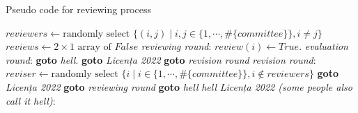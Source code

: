 \begin{algorithm}[ht]
    \caption{Pseudo code for reviewing process}\label{alg:acceptance}
    \begin{algorithmic}[1]
            \State $\textit{reviewers} \gets \text{randomly select } \{(i,j) \mid i,j \in  \{1, \cdots, \#\{\textit{committee}\}\}, i \neq j \}$
            \State $\textit{reviews} \gets 2 \times 1 \text{ array of } \textit{False}$
            \BState \emph{reviewing round}:
                    \State $\textit{review}(i) \gets \textit{True}$.
                \Else {}
                \EndIf
            \EndFor
            \BState \emph{evaluation round}:
                \State \textbf{goto} \emph{hell}.
                \State \textbf{goto} \emph{Licența 2022}
            \Else \textbf{ goto} \emph{revision round}
            \EndIf
            \BState \emph{revision round}:
            \State $\textit{reviser} \gets \text{randomly select } \{i \mid i \in  \{1, \cdots, \#\{\textit{committee}\}\}, i \not\in \textit{reviewers} \}$
                \State \textbf{ goto} \emph{Licența 2022}
                \State \textbf{ goto} \emph{reviewing round}
            \Else \textbf{ goto} \emph{hell}
            \EndIf
            \BState \emph{hell} 
            \State {}
            \BState \emph{Licența 2022 (some people also call it hell)}:
            \State {}
        \EndProcedure
    \end{algorithmic}
\end{algorithm}

\textcolor{gray}{\lipsum}